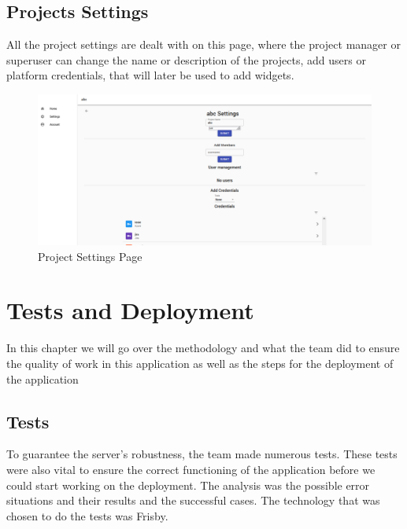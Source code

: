 \documentclass[a4paper,twoside,10pt]{report}
\begin{document}
\section{Projects Settings}
All the project settings are dealt with on this page, where the project manager or superuser can change the name or description of the projects, add users or platform credentials, that will later be used to add widgets.

\begin{figure}[h!]
\center
  \includegraphics[width=\textwidth]{projectsettingsPage.png}
\caption{Project Settings Page}
\end{figure}

\chapter{Tests and Deployment}
In this chapter we will go over the methodology and what the team did to ensure the quality of work in this application as well as the steps for the deployment of the application

\section{Tests}
To guarantee the server's robustness, the team made numerous tests. These tests were also vital to ensure the correct functioning of the application before we could start working on the deployment.  The analysis was the possible error situations and their results and the successful cases. The technology that was chosen to do the tests was Frisby.
\end{document}
